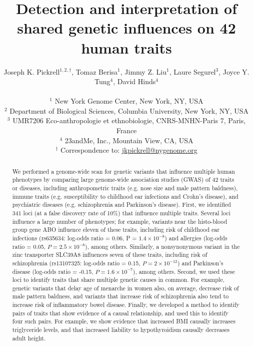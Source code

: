 \documentclass[11pt,titlepage]{article}
\begin{document}
\title{Detection and interpretation of shared genetic influences on 42 human traits}
\author{Joseph K. Pickrell$^{1,2, \dagger}$, Tomaz Berisa${^1}$, Jimmy Z. Liu${^1}$, Laure Segurel$^{3}$, Joyce Y. Tung${^4}$, David Hinds${^4}$\\ \\
\small $^1$ New York Genome Center, New York, NY, USA\\
\small $^2$ Department of Biological Sciences, Columbia University, New York, NY, USA \\
\small $^3$ UMR7206 Eco-anthropologie et ethnobiologie, CNRS-MNHN-Paris 7, Paris, France\\
\small $^4$ 23andMe, Inc., Mountain View, CA, USA\\
\small $^\dagger$ Correspondence to: \url{jkpickrell@nygenome.org}
}
\maketitle
\begin{abstract}
We performed a genome-wide scan for genetic variants that influence multiple human phenotypes by comparing large genome-wide association studies (GWAS) of 42 traits or diseases, including anthropometric traits (e.g. nose size and male pattern baldness), immune traits (e.g. susceptibility to childhood ear infections and Crohn's disease), and psychiatric diseases (e.g. schizophrenia and Parkinson's disease). First, we identified 341 loci (at a false discovery rate of 10\%) that influence multiple traits. Several loci influence a large number of phenotypes; for example, variants near the histo-blood group gene ABO influence eleven of these traits, including risk of childhood ear infections (rs635634: log-odds ratio = 0.06, P = $1.4 \times 10^{-8}$) and allergies (log-odds ratio = 0.05, $P = 2.5\times 10^{-8}$), among others. Similarly, a nonsynonymous variant in the zinc transporter SLC39A8 influences seven of these traits, including risk of schizophrenia (rs13107325: log-odds ratio = 0.15, $P = 2 \times 10^{-12}$) and Parkinson's disease (log-odds ratio = -0.15, $P = 1.6 \times 10^{-7}$), among others. Second, we used these loci to identify traits that share multiple genetic causes in common. For example, genetic variants that delay age of menarche in women also, on average, decrease risk of male pattern baldness, and variants that increase risk of schizophrenia also tend to increase risk of inflammatory bowel disease. Finally, we developed a method to identify pairs of traits that show evidence of a causal relationship, and used this to identify four such pairs. For example, we show evidence that increased BMI causally increases triglyceride levels, and that increased liability to hypothyroidism causally decreases adult height.   
\end{abstract}
\clearpage
\end{document}
